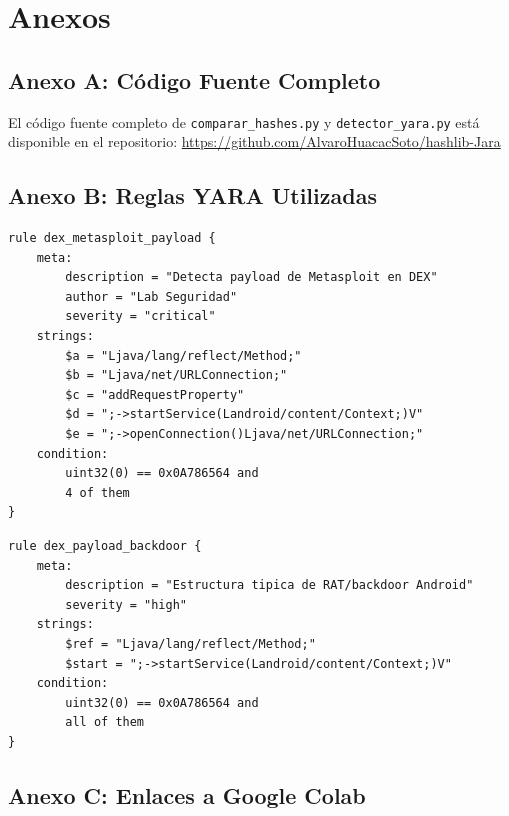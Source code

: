 \documentclass[12pt,a4paper]{article}
\begin{document}
\section*{Anexos}

\subsection*{Anexo A: Código Fuente Completo}

El código fuente completo de \texttt{comparar\_hashes.py} y
\texttt{detector\_yara.py} está disponible en el repositorio:
\url{https://github.com/AlvaroHuacacSoto/hashlib-Jara}

\subsection*{Anexo B: Reglas YARA Utilizadas}

\begin{lstlisting}[caption={Regla YARA: dex\_metasploit\_payload},
                   label=lst:anexo_yara1]
rule dex_metasploit_payload {
    meta:
        description = "Detecta payload de Metasploit en DEX"
        author = "Lab Seguridad"
        severity = "critical"
    strings:
        $a = "Ljava/lang/reflect/Method;"
        $b = "Ljava/net/URLConnection;"
        $c = "addRequestProperty"
        $d = ";->startService(Landroid/content/Context;)V"
        $e = ";->openConnection()Ljava/net/URLConnection;"
    condition:
        uint32(0) == 0x0A786564 and
        4 of them
}
\end{lstlisting}

\begin{lstlisting}[caption={Regla YARA: dex\_payload\_backdoor},
                   label=lst:anexo_yara2]
rule dex_payload_backdoor {
    meta:
        description = "Estructura tipica de RAT/backdoor Android"
        severity = "high"
    strings:
        $ref = "Ljava/lang/reflect/Method;"
        $start = ";->startService(Landroid/content/Context;)V"
    condition:
        uint32(0) == 0x0A786564 and
        all of them
}
\end{lstlisting}

\subsection*{Anexo C: Enlaces a Google Colab}
\end{document}
